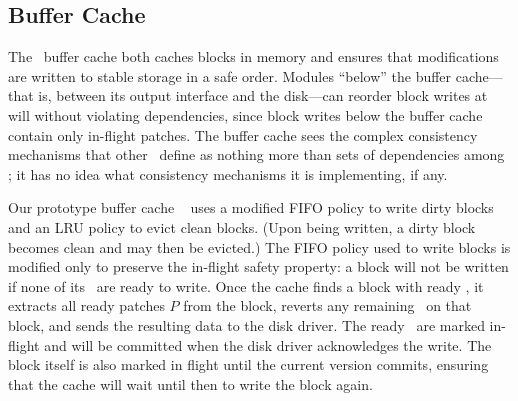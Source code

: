 
\subsection{Buffer Cache}
\label{sec:modules:wbcache}

The \Kudos\ buffer cache both
%
caches blocks in memory and
ensures that modifications are written to stable storage in a safe order.
%
Modules ``below'' the buffer cache---that is, between its output interface
and the disk---can reorder block writes at will without violating
dependencies, since block writes below the buffer cache contain only
in-flight patches.
%
%
The buffer cache sees the complex
consistency mechanisms that other \modules\ define as nothing more
than sets of dependencies among \patches; it has no idea what consistency
mechanisms it is implementing, if any.

Our prototype buffer cache \module\ 
%
uses a modified FIFO policy to write dirty blocks and an LRU policy to
evict clean blocks.  (Upon being written, a dirty block becomes clean and
may then be evicted.)
%
The FIFO policy used to write blocks is modified only to preserve the
in-flight safety property: a block will not be written if none of its
\patches\ are ready to write.
%
Once the cache finds a block with ready \patches, it extracts all ready
patches $P$ from the block, reverts any remaining \patches\ on that block,
and sends the resulting data to the disk driver.  The ready \patches\ are
marked in-flight and will be committed when the disk driver acknowledges
the write.
%
The block itself is also marked in flight until the current version
commits, ensuring that the cache will wait until then to write the block
again.


